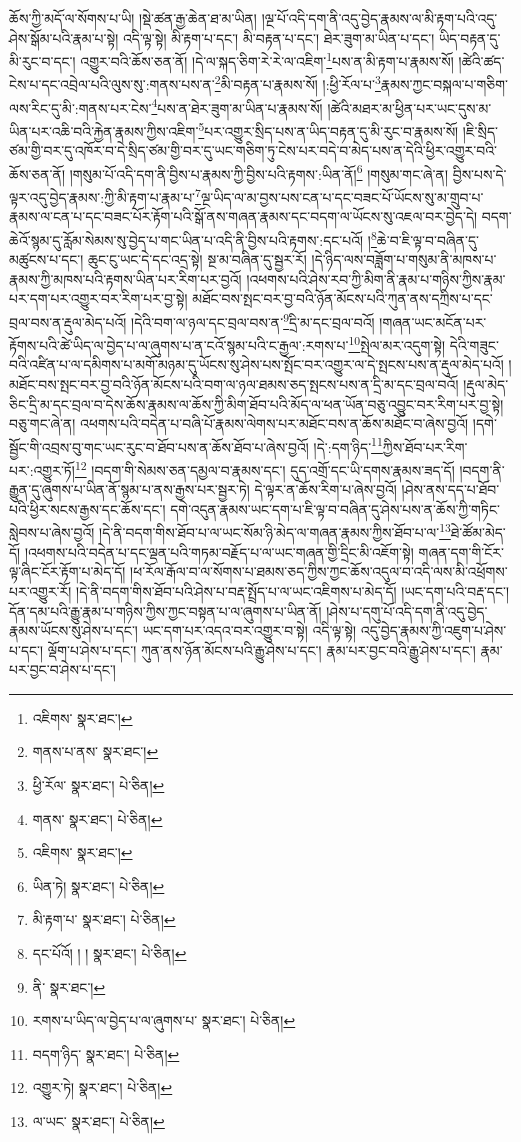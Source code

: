 ཆོས་ཀྱི་མདོ་ལ་སོགས་པ་ཡི། །སྡེ་ཚན་རྒྱ་ཆེན་ཐ་མ་ཡིན། །ལྔ་པོ་འདི་དག་ནི་འདུ་བྱེད་རྣམས་ལ་མི་རྟག་པའི་འདུ་ཤེས་སྒོམ་པའི་རྣམ་པ་སྟེ། འདི་ལྟ་སྟེ། མི་རྟག་པ་དང་། མི་བརྟན་པ་དང་། ཐེར་ཟུག་མ་ཡིན་པ་དང་། ཡིད་བརྟན་དུ་མི་རུང་བ་དང་། འགྱུར་བའི་ཆོས་ཅན་ནོ། །དེ་ལ་སྐད་ཅིག་རེ་རེ་ལ་འཇིག་\footnote{འཇིགས་  སྣར་ཐང་། }པས་ན་མི་རྟག་པ་རྣམས་སོ། །ཚེའི་ཚད་ངེས་པ་དང་འབྲེལ་པའི་ལུས་སུ་:གནས་པས་ན་\footnote{གནས་པ་ནས་  སྣར་ཐང་། }མི་བརྟན་པ་རྣམས་སོ། །:ཕྱི་རོལ་པ་\footnote{ཕྱི་རོལ་  སྣར་ཐང་།  པེ་ཅིན། }རྣམས་ཀྱང་བསྐལ་པ་གཅིག་ལས་རིང་དུ་མི་:གནས་པར་ངེས་\footnote{གནས་  སྣར་ཐང་།  པེ་ཅིན། }པས་ན་ཐེར་ཟུག་མ་ཡིན་པ་རྣམས་སོ། །ཚེའི་མཐར་མ་ཕྱིན་པར་ཡང་དུས་མ་ཡིན་པར་འཆི་བའི་རྐྱེན་རྣམས་ཀྱིས་འཇིག་\footnote{འཇིགས་  སྣར་ཐང་། }པར་འགྱུར་སྲིད་པས་ན་ཡིད་བརྟན་དུ་མི་རུང་བ་རྣམས་སོ། །ཇི་སྲིད་ཙམ་གྱི་བར་དུ་འཁོར་བ་དེ་སྲིད་ཙམ་གྱི་བར་དུ་ཡང་གཅིག་ཏུ་ངེས་པར་བདེ་བ་མེད་པས་ན་དེའི་ཕྱིར་འགྱུར་བའི་ཆོས་ཅན་ནོ། །གསུམ་པོ་འདི་དག་ནི་བྱིས་པ་རྣམས་ཀྱི་བྱིས་པའི་རྟགས་:ཡིན་ནོ།\footnote{ཡིན་ཏེ།  སྣར་ཐང་།  པེ་ཅིན། } །གསུམ་གང་ཞེ་ན། བྱིས་པས་དེ་ལྟར་འདུ་བྱེད་རྣམས་:ཀྱི་མི་རྟག་པ་རྣམ་པ་\footnote{མི་རྟག་པ་  སྣར་ཐང་།  པེ་ཅིན། }ལྔ་ཡིད་ལ་མ་བྱས་པས་ངན་པ་དང་བཟང་པོ་ཡོངས་སུ་མ་གྲུབ་པ་རྣམས་ལ་ངན་པ་དང་བཟང་པོར་རྟོག་པའི་སྒོ་ནས་གཞན་རྣམས་དང་བདག་ལ་ཡོངས་སུ་འཇལ་བར་བྱེད་དེ། བདག་ཆེའོ་སྙམ་དུ་རློམ་སེམས་སུ་བྱེད་པ་གང་ཡིན་པ་འདི་ནི་བྱིས་པའི་རྟགས་:དང་པའོ། །\footnote{དང་པོའོ། ། །  སྣར་ཐང་།  པེ་ཅིན། }ཆེ་བ་ཇི་ལྟ་བ་བཞིན་དུ་མཚུངས་པ་དང་། ཆུང་ངུ་ཡང་དེ་དང་འདྲ་སྟེ། སྔ་མ་བཞིན་དུ་སྦྱར་རོ། །དེ་ཉིད་ལས་བཟློག་པ་གསུམ་ནི་མཁས་པ་རྣམས་ཀྱི་མཁས་པའི་རྟགས་ཡིན་པར་རིག་པར་བྱའོ། །འཕགས་པའི་ཤེས་རབ་ཀྱི་མིག་ནི་རྣམ་པ་གཉིས་ཀྱིས་རྣམ་པར་དག་པར་འགྱུར་བར་རིག་པར་བྱ་སྟེ། མཐོང་བས་སྤང་བར་བྱ་བའི་ཉོན་མོངས་པའི་ཀུན་ནས་དཀྲིས་པ་དང་བྲལ་བས་ན་རྡུལ་མེད་པའོ། །དེའི་བག་ལ་ཉལ་དང་བྲལ་བས་ན་\footnote{ནི་  སྣར་ཐང་། }དྲི་མ་དང་བྲལ་བའོ། །གཞན་ཡང་མངོན་པར་རྟོགས་པའི་ཚེ་ཡིད་ལ་བྱེད་པ་ལ་ཞུགས་པ་ན་ངའོ་སྙམ་པའི་ང་རྒྱལ་:རགས་པ་\footnote{རགས་པ་ཡིད་ལ་བྱེད་པ་ལ་ཞུགས་པ་  སྣར་ཐང་།  པེ་ཅིན། }སྤེལ་མར་འདུག་སྟེ། དེའི་གཟུང་བའི་འཛིན་པ་ལ་དམིགས་པ་མགོ་མཉམ་དུ་ཡོངས་སུ་ཤེས་པས་སྤོང་བར་འགྱུར་ལ་དེ་སྤངས་པས་ན་རྡུལ་མེད་པའོ། །མཐོང་བས་སྤང་བར་བྱ་བའི་ཉོན་མོངས་པའི་བག་ལ་ཉལ་ཐམས་ཅད་སྤངས་པས་ན་དྲི་མ་དང་བྲལ་བའོ། །རྡུལ་མེད་ཅིང་དྲི་མ་དང་བྲལ་བ་དེས་ཆོས་རྣམས་ལ་ཆོས་ཀྱི་མིག་ཐོབ་པའི་མོད་ལ་ཕན་ཡོན་བཅུ་འབྱུང་བར་རིག་པར་བྱ་སྟེ། བཅུ་གང་ཞེ་ན། འཕགས་པའི་བདེན་པ་བཞི་པོ་རྣམས་ལེགས་པར་མཐོང་བས་ན་ཆོས་མཐོང་བ་ཞེས་བྱའོ། །དགེ་སྦྱོང་གི་འབྲས་བུ་གང་ཡང་རུང་བ་ཐོབ་པས་ན་ཆོས་ཐོབ་པ་ཞེས་བྱའོ། །དེ་:དག་ཉིད་\footnote{བདག་ཉིད་  སྣར་ཐང་།  པེ་ཅིན། }ཀྱིས་ཐོབ་པར་རིག་པར་:འགྱུར་ཏོ།\footnote{འགྱུར་ཏེ།  སྣར་ཐང་།  པེ་ཅིན། } །བདག་གི་སེམས་ཅན་དམྱལ་བ་རྣམས་དང་། དུད་འགྲོ་དང་ཡི་དགས་རྣམས་ཟད་དོ། །བདག་ནི་རྒྱུན་དུ་ཞུགས་པ་ཡིན་ནོ་སྙམ་པ་ནས་རྒྱས་པར་སྦྱར་ཏེ། དེ་ལྟར་ན་ཆོས་རིག་པ་ཞེས་བྱའོ། །ཤེས་ནས་དད་པ་ཐོབ་པའི་ཕྱིར་སངས་རྒྱས་དང་ཆོས་དང་། དགེ་འདུན་རྣམས་ཡང་དག་པ་ཇི་ལྟ་བ་བཞིན་དུ་ཤེས་པས་ན་ཆོས་ཀྱི་གཏིང་སླེབས་པ་ཞེས་བྱའོ། །དེ་ནི་བདག་གིས་ཐོབ་པ་ལ་ཡང་སོམ་ཉི་མེད་ལ་གཞན་རྣམས་ཀྱིས་ཐོབ་པ་ལ་\footnote{ལ་ཡང་  སྣར་ཐང་།  པེ་ཅིན། }ཐེ་ཚོམ་མེད་དོ། །འཕགས་པའི་བདེན་པ་དང་ལྡན་པའི་གཏམ་བརྗོད་པ་ལ་ཡང་གཞན་གྱི་དྲིང་མི་འཇོག་སྟེ། གཞན་དག་གི་ངོར་ལྟ་ཞིང་ངོར་རྟོག་པ་མེད་དོ། །ཕ་རོལ་རྒོལ་བ་ལ་སོགས་པ་ཐམས་ཅད་ཀྱིས་ཀྱང་ཆོས་འདུལ་བ་འདི་ལས་མི་འཕྲོགས་པར་འགྱུར་རོ། །དེ་ནི་བདག་གིས་ཐོབ་པའི་ཤེས་པ་བརྡ་སྤྲོད་པ་ལ་ཡང་འཇིགས་པ་མེད་དོ། །ཡང་དག་པའི་བརྡ་དང་། དོན་དམ་པའི་རྒྱུ་རྣམ་པ་གཉིས་ཀྱིས་ཀྱང་བསྟན་པ་ལ་ཞུགས་པ་ཡིན་ནོ། །ཤེས་པ་དགུ་པོ་འདི་དག་ནི་འདུ་བྱེད་རྣམས་ཡོངས་སུ་ཤེས་པ་དང་། ཡང་དག་པར་འདའ་བར་འགྱུར་བ་སྟེ། འདི་ལྟ་སྟེ། འདུ་བྱེད་རྣམས་ཀྱི་འཇུག་པ་ཤེས་པ་དང་། ལྡོག་པ་ཤེས་པ་དང་། ཀུན་ནས་ཉོན་མོངས་པའི་རྒྱུ་ཤེས་པ་དང་། རྣམ་པར་བྱང་བའི་རྒྱུ་ཤེས་པ་དང་། རྣམ་པར་བྱང་བ་ཤེས་པ་དང་། 